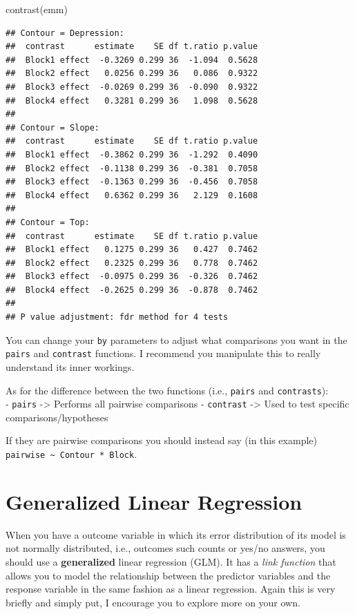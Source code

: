 \documentclass[
]{book}
\newenvironment{Shaded}{\begin{snugshade}}{\end{snugshade}}
\newcommand{\FunctionTok}[1]{\textcolor[rgb]{0.00,0.00,0.00}{#1}}
\newcommand{\NormalTok}[1]{#1}
\begin{document}
\begin{Shaded}
\begin{Highlighting}[]
\FunctionTok{contrast}\NormalTok{(emm)}
\end{Highlighting}
\end{Shaded}

\begin{verbatim}
## Contour = Depression:
##  contrast      estimate    SE df t.ratio p.value
##  Block1 effect  -0.3269 0.299 36  -1.094  0.5628
##  Block2 effect   0.0256 0.299 36   0.086  0.9322
##  Block3 effect  -0.0269 0.299 36  -0.090  0.9322
##  Block4 effect   0.3281 0.299 36   1.098  0.5628
## 
## Contour = Slope:
##  contrast      estimate    SE df t.ratio p.value
##  Block1 effect  -0.3862 0.299 36  -1.292  0.4090
##  Block2 effect  -0.1138 0.299 36  -0.381  0.7058
##  Block3 effect  -0.1363 0.299 36  -0.456  0.7058
##  Block4 effect   0.6362 0.299 36   2.129  0.1608
## 
## Contour = Top:
##  contrast      estimate    SE df t.ratio p.value
##  Block1 effect   0.1275 0.299 36   0.427  0.7462
##  Block2 effect   0.2325 0.299 36   0.778  0.7462
##  Block3 effect  -0.0975 0.299 36  -0.326  0.7462
##  Block4 effect  -0.2625 0.299 36  -0.878  0.7462
## 
## P value adjustment: fdr method for 4 tests
\end{verbatim}

You can change your \texttt{by} parameters to adjust what comparisons you want in the \texttt{pairs} and \texttt{contrast} functions. I recommend you manipulate this to really understand its inner workings.

As for the difference between the two functions (i.e., \texttt{pairs} and \texttt{contrasts}):\\
- \texttt{pairs} -\textgreater{} Performs all pairwise comparisons
- \texttt{contrast} -\textgreater{} Used to test specific comparisons/hypotheses

If they are pairwise comparisons you should instead say (in this example) \texttt{pairwise\ \textasciitilde{}\ Contour\ *\ Block}.

\hypertarget{generalized-linear-regression}{%
\section{Generalized Linear Regression}\label{generalized-linear-regression}}

When you have a outcome variable in which its error distribution of its model is not normally distributed, i.e., outcomes such counts or yes/no answers, you should use a \textbf{generalized} linear regression (GLM). It has a \emph{link function} that allows you to model the relationship between the predictor variables and the response variable in the same fashion as a linear regression. Again this is very briefly and simply put, I encourage you to explore more on your own.
\end{document}
